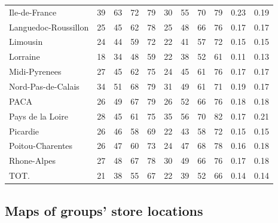 \documentclass[11pt]{article}
\begin{document}
\begin{table}[H]
\begin{tabular}{lrrrrrrrrrr}
Ile-de-France        &         39 &         63 &         72 &         79 &         30 &         55 &         70 &         79 &       0.23 &       0.19 \\
Languedoc-Roussillon &         25 &         45 &         62 &         78 &         25 &         48 &         66 &         76 &       0.17 &       0.17 \\
Limousin             &         24 &         44 &         59 &         72 &         22 &         41 &         57 &         72 &       0.15 &       0.15 \\
Lorraine             &         18 &         34 &         48 &         59 &         22 &         38 &         52 &         61 &       0.11 &       0.13 \\
Midi-Pyrenees        &         27 &         45 &         62 &         75 &         24 &         45 &         61 &         76 &       0.17 &       0.17 \\
Nord-Pas-de-Calais   &         34 &         51 &         68 &         79 &         31 &         49 &         61 &         71 &       0.19 &       0.17 \\
PACA                 &         26 &         49 &         67 &         79 &         26 &         52 &         66 &         76 &       0.18 &       0.18 \\
Pays de la Loire     &         28 &         45 &         61 &         75 &         35 &         56 &         70 &         82 &       0.17 &       0.21 \\
Picardie             &         26 &         46 &         58 &         69 &         22 &         43 &         58 &         72 &       0.15 &       0.15 \\
Poitou-Charentes     &         26 &         47 &         60 &         73 &         24 &         47 &         68 &         78 &       0.16 &       0.18 \\
Rhone-Alpes          &         27 &         48 &         67 &         78 &         30 &         49 &         66 &         76 &       0.17 &       0.18 \\
TOT.                 &         21 &         38 &         55 &         67 &         22 &         39 &         52 &         66 &       0.14 &       0.14 \\
\bottomrule
\end{tabular}

\end{table}

\subsection{Maps of groups' store locations}
\end{document}
